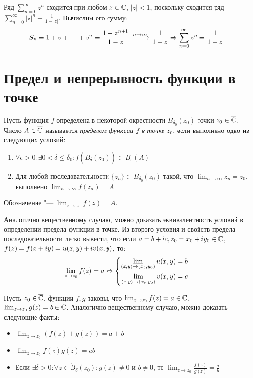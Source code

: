 \begin{example}
	Ряд $\sum_{n=0}^\infty z^n$ сходится при любом $z \in \mathbb{C}$, $|z| < 1$, поскольку сходится ряд $\sum_{n=0}^\infty |z|^n = \frac1{1-|z|}$. Вычислим его сумму:
	\[S_n = 1 + z + \dotsb + z^n = \frac{1-z^{n+1}}{1-z} \xrightarrow{n \to \infty} \frac1{1-z} \Rightarrow \sum_{n=0}^\infty z^n = \frac1{1-z}\]
\end{example}

\section{Предел и непрерывность функции в точке}

\begin{definition}
	Пусть функция $f$ определена в некоторой окрестности $\dot B_{\delta_0}(z_0)$ точки $z_0 \in \overline{\mathbb{C}}$. Число $A \in \overline{\mathbb{C}}$ называется \textit{пределом функции $f$ в точке $z_0$}, если выполнено одно из следующих условий:
	\begin{enumerate}
		\item $\forall \epsilon > 0: \exists 0 < \delta \le \delta_0: f(\dot B_\delta(z_0)) \subset B_\epsilon(A)$
		\item Для любой последовательности $\{z_n\} \subset \dot B_{\delta_0}(z_0)$ такой, что $\lim_{n \to \infty}z_n = z_0$, выполнено $\lim_{n \to \infty}f(z_n) = A$
	\end{enumerate}
	
	Обозначение "--- $\lim_{z \to z_0}f(z) = A$.
\end{definition}

\begin{note}
	Аналогично вещественному случаю, можно доказать эквивалентность условий в определении предела функции в точке. Из второго условия и свойств предела последовательности легко вывести, что если $a = b + ic, z_0 = x_0 + iy_0 \in \mathbb{C}$, $f(z) = f(x + iy) \hm= u(x, y) + iv(x, y)$, то:
	\[\lim_{z \to z_0}f(z) = a \Leftrightarrow \left\{\begin{aligned}
		\lim_{(x, y) \to (x_0, y_0)}u(x, y) = b\\
		\lim_{(x, y) \to (x_0, y_0)}v(x, y) = c
	\end{aligned}\right.\]
\end{note}

\begin{note}
	Пусть $z_0 \in \overline{\mathbb{C}}$, функции $f, g$ таковы, что $\lim_{z \to z_0}f(z) = a \in \mathbb{C}$, $\lim_{z \to z_0}g(z) \hm= b \in \Cm$. Аналогично вещественному случаю, можно доказать следующие факты:
	\begin{itemize}
		\item $\lim_{z \to z_0}(f(z) + g(z)) = a+b$
		\item $\lim_{z \to z_0}f(z)g(z) = ab$
		\item Если $\exists \delta > 0: \forall z \in \dot B_\delta(z_0) : g(z) \ne 0$ и $b \ne 0$, то $\lim_{z \to z_0}\frac{f(z)}{g(z)} = \frac ab$
	\end{itemize}
\end{note}


